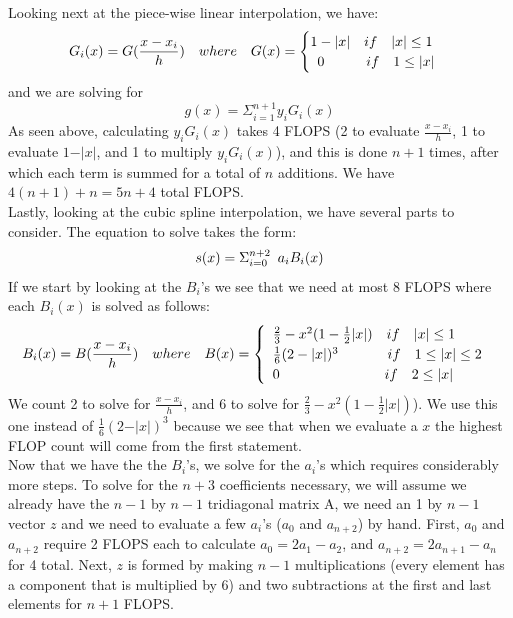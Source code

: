\documentclass[11pt,a4paper]{article}
\begin{document}
\begin{itemize}
\begin{enumerate} [label={\alph*)}]
					Looking next at the piece-wise linear interpolation, we have:
					$$G_i(x) = G(\frac{x-x_i}{h}) \quad where \quad G(x) = \begin{cases}
					1-\vert x \vert \quad if \quad \vert x \vert \leq 1 \\
					\mkern9mu 0 \quad \quad \quad if \quad 1 \leq \vert x \vert
					\end{cases}$$
					and we are solving for
					$$g(x) = \Sigma_{i=1}^{n+1} y_iG_i(x) $$
					As seen above, calculating $y_iG_i(x)$ takes 4 FLOPS (2 to evaluate $\frac{x-x_i}{h}$, 1 to evaluate $1-\vert x \vert$, and 1 to multiply $y_iG_i(x)$), and this is done $n+1$ times, after which each term is summed for a total of $n$ additions. We have $4(n+1)+n = 5n+4$ total FLOPS. \\
					
					Lastly, looking at the cubic spline interpolation, we have several parts to consider. The equation to solve takes the form:
					$$s(x) = \Sigma_{i=0}^{n+2}\mkern9mu a_iB_i(x)$$
					If we start by looking at the $B_i$'s we see that we need at most 8 FLOPS where each $B_i(x)$ is solved as follows:
					$$B_i(x) = B(\frac{x-x_i}{h}) \quad where \quad B(x) = \begin{cases}
					\mkern9mu \frac{2}{3} - x^2(1-\frac{1}{2}\vert x \vert)\quad if \quad \vert x \vert \leq 1 \\
					\mkern9mu \frac{1}{6}(2-\vert x \vert)^3 \quad \quad \quad \mkern9mu  if \quad 1 \leq \vert x \vert \leq 2 \\
					\mkern9mu 0 \quad \quad \quad \quad \quad \quad \quad \mkern9mu  if \quad 2 \leq \vert x \vert
					\end{cases}$$
					We count 2 to solve for $\frac{x-x_i}{h}$, and 6 to solve for $\frac{2}{3} - x^2(1-\frac{1}{2}\vert x \vert)$). We use this one instead of $\frac{1}{6}(2-\vert x \vert)^3$ because we see that when we evaluate a $x$ the highest FLOP count will come from the first statement.\\
					Now that we have the the $B_i$'s, we solve for the $a_i$'s which requires considerably more steps. To solve for the $n+3$ coefficients necessary, we will assume we already have the $n-1$ by $n-1$ tridiagonal matrix A, we need an 1 by $n-1$ vector $z$ and we need to evaluate a few $a_i$'s ($a_0$ and $a_{n+2}$) by hand. First, $a_0$ and $a_{n+2}$ require 2 FLOPS each to calculate $a_0 = 2a_1-a_2$, and $a_{n+2} = 2a_{n+1}-a_{n}$ for 4 total. Next, $z$ is formed by making $n-1$ multiplications (every element has a component that is multiplied by 6) and two subtractions at the first and last elements for $n+1$ FLOPS. \\
					

\end{enumerate}
\end{itemize}
\end{document}
